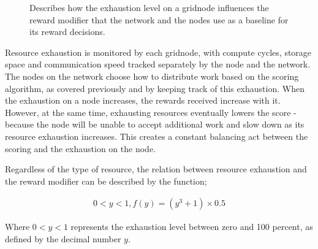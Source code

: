 \documentclass[10pt,a4paper,final]{article}
\begin{document}
\begin{figure}[htb]
	\centering
		\caption{Describes how the exhaustion level on a \gls{gridnode} influences the reward modifier that the network and the nodes use as a baseline for its reward decisions.}
\end{figure}

\noindent Resource exhaustion is monitored by each \gls{gridnode}, with compute cycles, storage space and communication speed tracked separately by the node and the network. The nodes on the network choose how to distribute work based on the scoring algorithm, as covered previously and by keeping track of this exhaustion. When the exhaustion on a node increases, the rewards received increase with it. However, at the same time, exhausting resources eventually lowers the score - because the node will be unable to accept additional work and slow down as its resource exhaustion increases. This creates a constant balancing act between the scoring and the exhaustion on the node.

\newpage
\noindent Regardless of the type of resource, the relation between resource exhaustion and the reward modifier can be described by the function;

\[
	\begin{array}{l}
	0 < y < 1, f(y) = (y^3 + 1) \times 0.5
	\end{array}	
\]

\noindent Where $0 < y < 1$ represents the exhaustion level between zero and 100 percent, as defined by the decimal number $y$.
\end{document}
